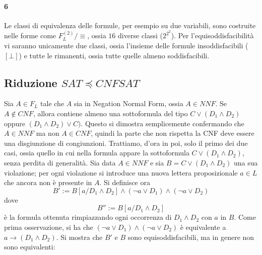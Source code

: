 \paragraph{6} Le classi di equivalenza delle formule, per esempio su 
due variabili, sono costruite nelle forme come $F_L^{(2)}/\equiv$, ossia 
$16$ diverse classi ($2^{2^2}$). Per l'equisoddisfacibilità vi saranno unicamente 
due classi, ossia l'insieme delle formule insoddisfacibili ($[\bot]$) e 
tutte le rimanenti, ossia tutte quelle almeno soddisfacibili.  

\subsection{Riduzione $SAT \preceq CNFSAT$}
Sia $A \in F_L$ tale che $A$ sia in Negation Normal Form, ossia $A \in NNF$. 
Se $A \notin CNF$, allora contiene almeno una sottoformula del tipo 
$C \lor (D_1 \land D_2)$ oppure $(D_1 \land D_2) \lor C)$. Questo si dimostra 
semplicemente confermando che $A \in NNF$ ma non $A \in CNF$, quindi la parte 
che non rispetta la CNF deve essere una disgiunzione di congiunzioni. Trattiamo, 
d'ora in poi, solo il primo dei due casi, ossia quello in cui nella formula 
appare la sottoformula $C \lor (D_1 \land D_2)$, senza perdita di generalità.
Sia data $A \in NNF$ e sia $B = C \lor (D_1 \land D_2)$ una sua violazione; 
per ogni violazione si introduce una nuova lettera proposizionale $a \in L$ che 
ancora non è presente in $A$. 
Si definisce ora 
$$
B' := B[a/D_1 \land D_2] \land (\neg a \lor D_1) \land (\neg a \lor D_2)
$$
dove 
$$
B'' := B[a/D_1\land D_2]
$$
è la formula ottenuta rimpiazzando ogni occorrenza di $D_1 \land D_2$ con $a$ 
in $B$. 
Come prima osservazione, si ha che $(\neg a \lor D_1) \land (\neg a \lor D_2)$ 
è equivalente a $a \rightarrow (D_1 \land D_2)$. 
Si mostra che $B'$ e $B$ sono equisoddisfacibili, ma in genere non 
sono equivalenti: 
